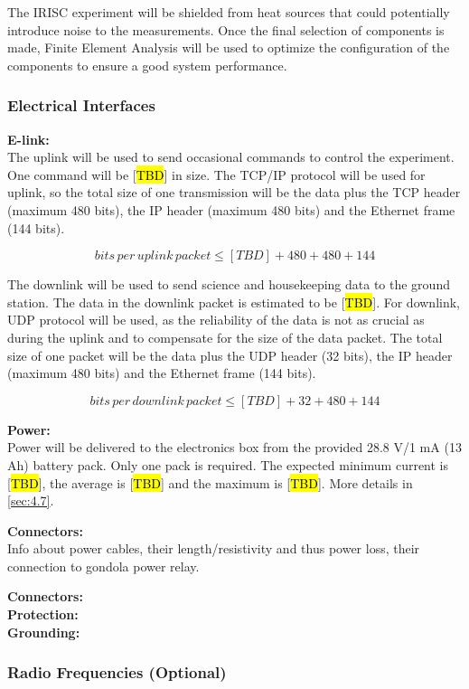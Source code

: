 The IRISC experiment will be shielded from heat sources that could potentially introduce noise to the measurements. Once the final selection of components is made, Finite Element Analysis will be used to optimize the configuration of the components to ensure a good system performance.

\label{sec:4.2.2}


\subsubsection{Electrical Interfaces}
\label{sec:4.2.3}
\textbf{E-link:}\\
The uplink will be used to send occasional commands to control the experiment. One command will be [\hl{TBD}] in size. The TCP/IP protocol will be used for uplink, so the total size of one transmission will be the data plus the TCP header (maximum 480 bits), the IP header (maximum 480 bits) and the Ethernet frame (144 bits).

$$ bits\, per\, uplink\, packet \leq [TBD] + 480 + 480 + 144 $$

The downlink will be used to send science and housekeeping data to the ground station. The data in the downlink packet is estimated to be [\hl{TBD}]. For downlink, UDP protocol will be used, as the reliability of the data is not as crucial as during the uplink and to compensate for the size of the data packet. The total size of one packet will be the data plus the UDP header (32 bits), the IP header (maximum 480 bits) and the Ethernet frame (144 bits).

$$ bits\, per\, downlink\, packet \leq [TBD] + 32 + 480 + 144 $$

\textbf{Power:}\\

Power will be delivered to the electronics box from the provided 28.8 V/1 mA (13 Ah) battery pack. Only one pack is required. The expected minimum current is [\hl{TBD}], the average is [\hl{TBD}] and the maximum is [\hl{TBD}]. More details in \ref{sec:4.7}.

\textbf{Connectors:}\\

%

Info about power cables, their length/resistivity and thus power loss, their connection to gondola power relay.



\textbf{Connectors:}\\

\textbf{Protection:}\\

\textbf{Grounding:}\\


\subsubsection{Radio Frequencies (Optional)}



\raggedbottom
